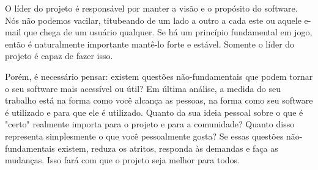 O líder do projeto é responsável por manter a visão e o propósito do software.
Nós não podemos vacilar, titubeando de um lado a outro a cada este ou aquele
e-mail que chega de um usuário qualquer. Se há um princípio fundamental em jogo, então
é naturalmente importante mantê-lo forte e estável. Somente o líder do projeto
é capaz de fazer isso.

Porém, é necessário pensar: existem questões não-fundamentais que podem tornar o seu
software mais acessível ou útil? Em última análise, a medida do seu trabalho
está na forma como você alcança as pessoas, na forma como seu software é utilizado e para
que ele é utilizado. Quanto da sua ideia pessoal sobre o que é "certo" realmente
importa para o projeto e para a comunidade? Quanto disso representa simplesmente o que você
pessoalmente gosta? Se essas questões não-fundamentais existem, reduza os atritos,
responda às demandas e faça as mudanças. Isso fará com que o projeto seja melhor
para todos.
